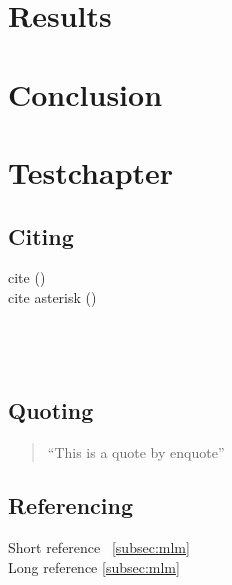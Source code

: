 \documentclass[english]{ttlab-qualify}
\begin{document}
    \chapter{Results}
    \label{ch:results}
    


    \chapter{Conclusion}
    \label{ch:conclusion}
    

    \chapter{\latex Testchapter}
    \section{Citing}
    cite (\cite{METZLER2016})\\
    cite asterisk (\cite*{METZLER2016})\\
    ~\cite{WORDTYPOLOGY}\\
    ~\cite{LINGUISTICTYPOLOGY}\\
    ~\cite{MMM4}\\
    \section{Quoting}
    \begin{quote}
        \enquote{This is a quote by enquote}
    \end{quote}

    \section{Referencing}
    Short reference ~\ref{subsec:mlm}\\
    Long reference \autoref{subsec:mlm}\\

    \appendix
    \printbibliography
\end{document}
